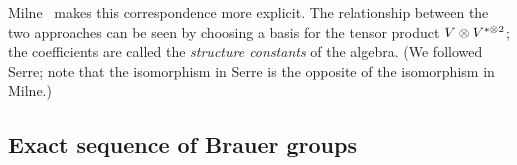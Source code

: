 \begin{rem}
Milne~\cite{Mi08} makes this correspondence more explicit. The relationship between the two approaches can be seen by choosing a basis for the tensor product $V\otimes {V}^{*\otimes 2}$; the coefficients are called the {\it structure constants} of the algebra. (We followed Serre; note that the isomorphism in Serre is the opposite of the isomorphism in Milne.)
\end{rem}
\subsection{Exact sequence of Brauer groups}
%
